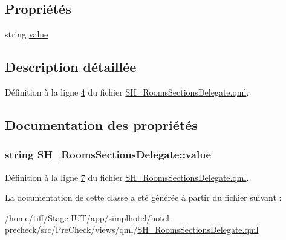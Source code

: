 \subsection*{Propriétés}
\begin{DoxyCompactItemize}
\item 
string \hyperlink{classSH__RoomsSectionsDelegate_a4d550c8d2c0adc9c76ae6d2a4e5a6acd}{value}
\end{DoxyCompactItemize}


\subsection{Description détaillée}


Définition à la ligne \hyperlink{SH__RoomsSectionsDelegate_8qml_source_l00004}{4} du fichier \hyperlink{SH__RoomsSectionsDelegate_8qml_source}{S\-H\-\_\-\-Rooms\-Sections\-Delegate.\-qml}.



\subsection{Documentation des propriétés}
\hypertarget{classSH__RoomsSectionsDelegate_a4d550c8d2c0adc9c76ae6d2a4e5a6acd}{
\subsubsection[{value}]{\setlength{\rightskip}{0pt plus 5cm}string S\-H\-\_\-\-Rooms\-Sections\-Delegate\-::value}}\label{classSH__RoomsSectionsDelegate_a4d550c8d2c0adc9c76ae6d2a4e5a6acd}


Définition à la ligne \hyperlink{SH__RoomsSectionsDelegate_8qml_source_l00007}{7} du fichier \hyperlink{SH__RoomsSectionsDelegate_8qml_source}{S\-H\-\_\-\-Rooms\-Sections\-Delegate.\-qml}.



La documentation de cette classe a été générée à partir du fichier suivant \-:\begin{DoxyCompactItemize}
\item 
/home/tiff/\-Stage-\/\-I\-U\-T/app/simplhotel/hotel-\/precheck/src/\-Pre\-Check/views/qml/\hyperlink{SH__RoomsSectionsDelegate_8qml}{S\-H\-\_\-\-Rooms\-Sections\-Delegate.\-qml}\end{DoxyCompactItemize}
